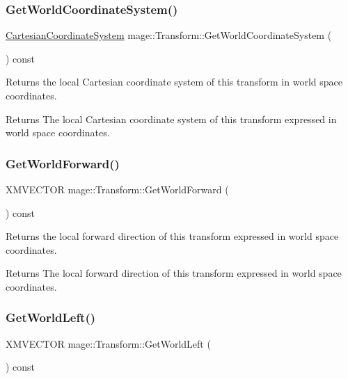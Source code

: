 \subsubsection{\texorpdfstring{Get\+World\+Coordinate\+System()}{GetWorldCoordinateSystem()}}
{\footnotesize\ttfamily \hyperlink{structmage_1_1_cartesian_coordinate_system}{Cartesian\+Coordinate\+System} mage\+::\+Transform\+::\+Get\+World\+Coordinate\+System (\begin{DoxyParamCaption}{ }\end{DoxyParamCaption}) const}

Returns the local Cartesian coordinate system of this transform in world space coordinates.

\begin{DoxyReturn}{Returns}
The local Cartesian coordinate system of this transform expressed in world space coordinates. 
\end{DoxyReturn}
\hypertarget{structmage_1_1_transform_a24bd3a710a3c0bde7a6d2f2de56a315c}{}\label{structmage_1_1_transform_a24bd3a710a3c0bde7a6d2f2de56a315c} 
\subsubsection{\texorpdfstring{Get\+World\+Forward()}{GetWorldForward()}}
{\footnotesize\ttfamily X\+M\+V\+E\+C\+T\+OR mage\+::\+Transform\+::\+Get\+World\+Forward (\begin{DoxyParamCaption}{ }\end{DoxyParamCaption}) const}

Returns the local forward direction of this transform expressed in world space coordinates.

\begin{DoxyReturn}{Returns}
The local forward direction of this transform expressed in world space coordinates. 
\end{DoxyReturn}
\hypertarget{structmage_1_1_transform_aef18a0e685f56ce4a805b2fef57287f6}{}\label{structmage_1_1_transform_aef18a0e685f56ce4a805b2fef57287f6} 
\subsubsection{\texorpdfstring{Get\+World\+Left()}{GetWorldLeft()}}
{\footnotesize\ttfamily X\+M\+V\+E\+C\+T\+OR mage\+::\+Transform\+::\+Get\+World\+Left (\begin{DoxyParamCaption}{ }\end{DoxyParamCaption}) const}

